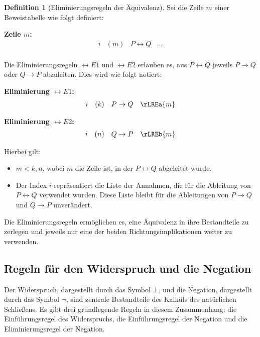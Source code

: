 \documentclass{book}
\theoremstyle{plain}
\theoremstyle{remark}
\theoremstyle{definition}
\newtheorem{definition}{Definition}[section]
\begin{document}
\begin{definition}[Eliminierungsregeln der Äquivalenz]
Sei die Zeile \(m\) einer Beweistabelle wie folgt definiert:

\textbf{Zeile \(m\):}
\[
\begin{array}{llll}
    i & (m) & P \leftrightarrow Q & \dots \\
\end{array}
\]

Die Eliminierungsregeln \(\leftrightarrow E1\) und \(\leftrightarrow E2\) erlauben es, aus \(P \leftrightarrow Q\) jeweils \(P \rightarrow Q\) oder \(Q \rightarrow P\) abzuleiten. Dies wird wie folgt notiert:

\textbf{Eliminierung \(\leftrightarrow E1\):}
\[
\begin{array}{llll}
    i & (k) & P \rightarrow Q & \rLREa{m} \\
\end{array}
\]

\textbf{Eliminierung \(\leftrightarrow E2\):}
\[
\begin{array}{llll}
    i & (n) & Q \rightarrow P & \rLREb{m} \\
\end{array}
\]

Hierbei gilt:
\begin{itemize}
    \item \(m < k, n\), wobei \(m\) die Zeile ist, in der \(P \leftrightarrow Q\) abgeleitet wurde.
    \item Der Index \(i\) repräsentiert die Liste der Annahmen, die für die Ableitung von \(P \leftrightarrow Q\) verwendet wurden. Diese Liste bleibt für die Ableitungen von \(P \rightarrow Q\) und \(Q \rightarrow P\) unverändert.
\end{itemize}

Die Eliminierungsregeln ermöglichen es, eine Äquivalenz in ihre Bestandteile zu zerlegen und jeweils nur eine der beiden Richtungsimplikationen weiter zu verwenden.
\end{definition}

\subsection{Regeln für den Widerspruch und die Negation}

Der Widerspruch, dargestellt durch das Symbol \(\bot\), und die Negation, dargestellt durch das Symbol \(\neg\), sind zentrale Bestandteile des Kalküls des natürlichen Schließens. Es gibt drei grundlegende Regeln in diesem Zusammenhang: die Einführungsregel des Widerspruchs, die Einführungsregel der Negation und die Eliminierungsregel der Negation.
\end{document}
